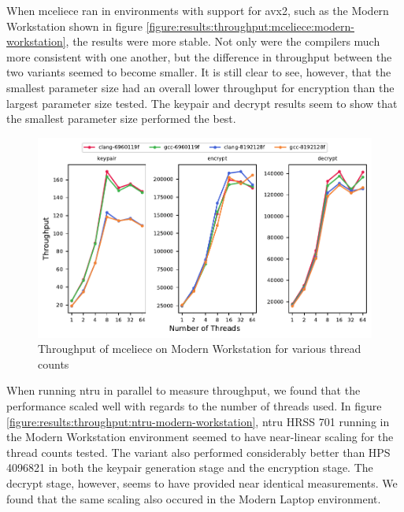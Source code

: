 \clearpage
\noindent When \gls{mceliece} ran in environments with support for \gls{avx2}, such as the Modern Workstation shown in figure \ref{figure:results:throughput:mceliece:modern-workstation}, the results were more stable. Not only were the compilers much more consistent with one another, but the difference in throughput between the two variants seemed to become smaller. It is still clear to see, however, that the smallest parameter size had an overall lower throughput for encryption than the largest parameter size tested. The keypair and decrypt results seem to show that the smallest parameter size performed the best.

\begin{figure}
    \centering
    \includegraphics[scale=0.75]{chapters/results/throughput/Modern Workstation_mceliece.pdf}
    \caption{Throughput of \gls{mceliece} on Modern Workstation for various thread counts}
    \label{figure:results:throughput:mceliece-modern-workstation}
\end{figure}

When running \gls{ntru} in parallel to measure throughput, we found that the performance scaled well with regards to the number of threads used. In figure \ref{figure:results:throughput:ntru-modern-workstation}, \gls{ntru} HRSS 701 running in the Modern Workstation environment seemed to have near-linear scaling for the thread counts tested. The variant also performed considerably better than HPS 4096821 in both the keypair generation stage and the encryption stage. The decrypt stage, however, seems to have provided near identical measurements. We found that the same scaling also occured in the Modern Laptop environment.

